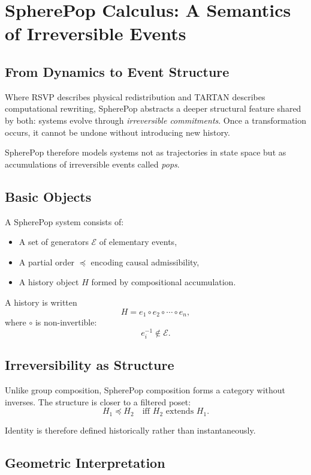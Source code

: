 \documentclass[12pt]{article}
\begin{document}
\section{SpherePop Calculus: A Semantics of Irreversible Events}

\subsection{From Dynamics to Event Structure}

Where RSVP describes physical redistribution and TARTAN describes computational rewriting, SpherePop abstracts a deeper structural feature shared by both: systems evolve through \emph{irreversible commitments}. Once a transformation occurs, it cannot be undone without introducing new history.

SpherePop therefore models systems not as trajectories in state space but as accumulations of irreversible events called \emph{pops}.

\subsection{Basic Objects}

A SpherePop system consists of:

\begin{itemize}
\item A set of generators $\mathcal{E}$ of elementary events,
\item A partial order $\preceq$ encoding causal admissibility,
\item A history object $H$ formed by compositional accumulation.
\end{itemize}

A history is written
\[
H = e_1 \circ e_2 \circ \cdots \circ e_n,
\]
where $\circ$ is non-invertible:
\[
e_i^{-1} \notin \mathcal{E}.
\]

\subsection{Irreversibility as Structure}

Unlike group composition, SpherePop composition forms a category without inverses. The structure is closer to a filtered poset:
\[
H_1 \preceq H_2 \quad \text{iff } H_2 \text{ extends } H_1.
\]

Identity is therefore defined historically rather than instantaneously.

\subsection{Geometric Interpretation}
\end{document}
